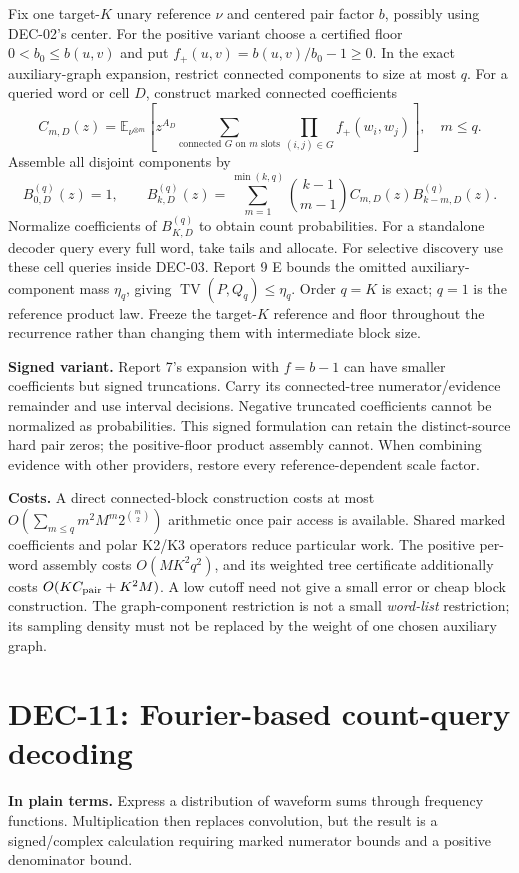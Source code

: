 \documentclass[10pt,a4paper]{article}
\newcommand{\E}{\mathbb E}
\newcommand{\TV}{\operatorname{TV}}
\begin{document}
Fix one target-$K$ unary reference $\nu$ and centered pair factor $b$, possibly using DEC-02's center.
For the positive variant choose a certified floor $0<b_0\leq b(u,v)$ and put
$f_+(u,v)=b(u,v)/b_0-1\geq0$.
In the exact auxiliary-graph expansion, restrict connected components to size at most $q$.
For a queried word or cell $D$, construct marked connected coefficients
\[
 C_{m,D}(z)=\E_{\nu^{\otimes m}}\!
 \left[z^{A_D}\sum_{\text{connected }G\text{ on }m\text{ slots}}
                         \prod_{(i,j)\in G}f_+(w_i,w_j)\right],\quad m\leq q.
\]
Assemble all disjoint components by
\[
 B_{0,D}^{(q)}(z)=1,\qquad
 B_{k,D}^{(q)}(z)=\sum_{m=1}^{\min(k,q)}
       \binom{k-1}{m-1}C_{m,D}(z)B_{k-m,D}^{(q)}(z).
\]
Normalize coefficients of $B_{K,D}^{(q)}$ to obtain count probabilities.
For a standalone decoder query every full word, take tails and allocate.
For selective discovery use these cell queries inside DEC-03.
Report 9 E bounds the omitted auxiliary-component mass $\eta_q$, giving $\TV(P,Q_q)\leq\eta_q$.
Order $q=K$ is exact; $q=1$ is the reference product law. Freeze the target-$K$ reference and floor
throughout the recurrence rather than changing them with intermediate block size.

\textbf{Signed variant.} Report 7's expansion with $f=b-1$ can have smaller coefficients but signed
truncations. Carry its connected-tree numerator/evidence remainder and use interval decisions.
Negative truncated coefficients cannot be normalized as probabilities. This signed formulation can
retain the distinct-source hard pair zeros; the positive-floor product assembly cannot.
When combining evidence with other providers, restore every reference-dependent scale factor.

\textbf{Costs.} A direct connected-block construction costs at most
$O(\sum_{m\leq q}m^2M^m2^{\binom m2})$ arithmetic once pair access is available.
Shared marked coefficients and polar K2/K3 operators reduce particular work.
The positive per-word assembly costs $O(MK^2q^2)$, and its weighted tree certificate additionally costs
$O(KC_{\rm pair}+K^2M)$. A low cutoff need not give a small error or cheap block construction.
The graph-component restriction is not a small \emph{word-list} restriction; its sampling density must
not be replaced by the weight of one chosen auxiliary graph.

\clearpage
\section{DEC-11: Fourier-based count-query decoding}
\label{sec:fourier}
\textbf{In plain terms.} Express a distribution of waveform sums through frequency functions.
Multiplication then replaces convolution, but the result is a signed/complex calculation requiring
marked numerator bounds and a positive denominator bound.
\end{document}
